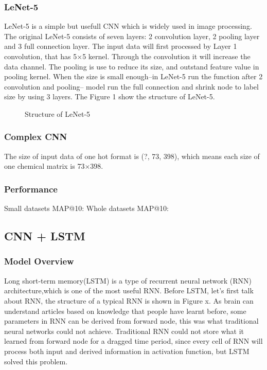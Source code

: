 \documentclass{article}
\begin{document}
\subsubsection{LeNet-5}
LeNet-5 is a simple but usefull CNN which is widely used in image processing. The original LeNet-5 consists of seven layers: 2 convolution layer, 2 pooling layer and 3 full connection layer. The input data will first processed by Layer 1 convolution, that has 5$\times$5 kernel. Through the convolution it will increase the data channel. The pooling is use to reduce its size, and outstand feature value in pooling kernel. When the size is small enough--in LeNet-5 run the function after 2 convolution and pooling-- model run the full connection and shrink node to label size by using 3 layers. The Figure 1 show the structure of LeNet-5.
\begin{figure}[h]
  \centering
  \caption{Structure of LeNet-5}
\end{figure} 

\subsubsection{Complex CNN}
The size of input data of one hot format is (?, 73, 398), which means each size of one chemical matrix is 73$\times$398. 


\subsubsection{Performance}
Small datasets MAP@10: 
Whole datasets MAP@10: 

\subsection{CNN + LSTM}
\subsubsection{Model Overview}
Long short-term memory(LSTM) is a type of recurrent neural network (RNN) architecture,which is one of the most useful RNN.  Before LSTM, let's first talk about RNN, the structure of a typical RNN is shown in Figure x. As brain can understand articles based on knowledge that people have learnt before, some parameters in RNN can be derived from forward node, this was what traditional neural networks could not achieve. Traditional RNN could not store what it learned from forward node for a dragged time period, since every cell of RNN will process both input and derived information in activation function, but LSTM solved this problem.
\end{document}
